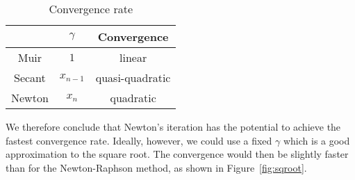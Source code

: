 \begin{table} \center
\caption{Convergence rate}
\label{convergence}
\begin{tabular}{|c|c|c|}\hline
\R        & $\gamma$   & Convergence     \\\hline
\R Muir   & $1$        & linear          \\\hline
\R Secant & $x_{n-1}$  & quasi-quadratic \\\hline
\R Newton & $x_n$      & quadratic       \\\hline
\end{tabular}
\end{table}
\par
We therefore conclude that Newton's iteration has the potential to
achieve the fastest convergence rate. Ideally, however, we could use
a fixed $\gamma$ which is a good approximation to the square root. The
convergence would then be slightly faster than for the Newton-Raphson 
method, as shown in Figure~\ref{fig:sqroot}.


